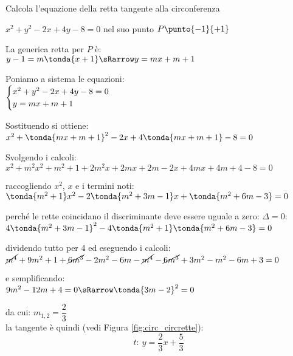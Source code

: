 \begin{esempio}
Calcola l'equazione della retta tangente alla circonferenza 

\(x^2 +y^2 -2x +4y -8 = 0\) nel suo punto \(P \punto{-1}{+1}\) 

La generica retta per \(P\) è: \\
\(y -1 = m \tonda{x +1} \sRarrow y = mx +m +1\)

Poniamo a sistema le equazioni: \\  
\(\begin{cases}x^2 + y^2 -2x +4y -8 = 0 \\ y = mx +m +1\end{cases}\) 

Sostituendo si ottiene: \\    
\(x^2 + \tonda{mx +m +1}^2 -2x +4\tonda{mx +m +1} -8 = 0\) 

Svolgendo i calcoli: \\    
\(x^2 + m^2x^2 +m^2 +1 +2m^2x +2mx +2m -2x +4mx +4m +4 -8 = 0\) 

raccogliendo \(x^2\), \(x\) e i termini noti: \\    
\(\tonda{m^2+1}x^2 -2\tonda{m^2 +3m -1}x +\tonda{m^2 +6m -3} = 0\) 

perché le rette coincidano il discriminante deve essere 
uguale a zero: \(\Delta = 0\): \\ 
\(4\tonda{m^2 +3m -1}^2 -4 \tonda{m^2 +1}\tonda{m^2 +6m -3} = 0\) 

dividendo tutto per 4 ed eseguendo i calcoli: \\ 
\(\cancel{m^4} +9m^2 +1 +\cancel{6m^3} -2m^2 -6m -
\cancel{m^4} -\cancel{6m^3} +3m^2 -m^2 -6m +3 = 0\) 

e semplificando: \\ 
\(9m^2 -12m +4 = 0 \sRarrow \tonda{3m -2}^2 = 0\) 

da cui: \(m_{1,2} = \dfrac{2}{3} \)\\
la tangente è quindi (vedi Figura \ref{fig:circ_circrette}):
\[t:~y = \dfrac{2}{3}x +\dfrac{5}{3}\]
\end{esempio}

